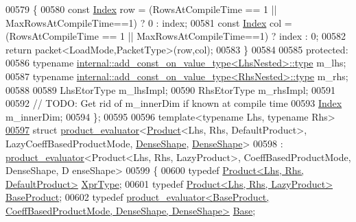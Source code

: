 \begin{DoxyCode}
00579 \textcolor{keyword}{  }\{
00580     \textcolor{keyword}{const} \hyperlink{namespace_eigen_a62e77e0933482dafde8fe197d9a2cfde}{Index} row = (RowsAtCompileTime == 1 || MaxRowsAtCompileTime==1) ? 0 : index;
00581     \textcolor{keyword}{const} \hyperlink{namespace_eigen_a62e77e0933482dafde8fe197d9a2cfde}{Index} col = (RowsAtCompileTime == 1 || MaxRowsAtCompileTime==1) ? index : 0;
00582     \textcolor{keywordflow}{return} packet<LoadMode,PacketType>(row,col);
00583   \}
00584 
00585 \textcolor{keyword}{protected}:
00586   \textcolor{keyword}{typename} \hyperlink{group___sparse_core___module}{internal::add\_const\_on\_value\_type<LhsNested>::type}
       m\_lhs;
00587   \textcolor{keyword}{typename} \hyperlink{group___sparse_core___module}{internal::add\_const\_on\_value\_type<RhsNested>::type}
       m\_rhs;
00588   
00589   LhsEtorType m\_lhsImpl;
00590   RhsEtorType m\_rhsImpl;
00591 
00592   \textcolor{comment}{// TODO: Get rid of m\_innerDim if known at compile time}
00593   \hyperlink{namespace_eigen_a62e77e0933482dafde8fe197d9a2cfde}{Index} m\_innerDim;
00594 \};
00595 
00596 \textcolor{keyword}{template}<\textcolor{keyword}{typename} Lhs, \textcolor{keyword}{typename} Rhs>
\hyperlink{struct_eigen_1_1internal_1_1product__evaluator_3_01_product_3_01_lhs_00_01_rhs_00_01_default_pro06ca9210bc576c533682d6dfc3cec111}{00597} \textcolor{keyword}{struct }\hyperlink{struct_eigen_1_1internal_1_1product__evaluator}{product\_evaluator}<\hyperlink{group___core___module_class_eigen_1_1_product}{Product}<Lhs, Rhs, DefaultProduct>, 
      LazyCoeffBasedProductMode, \hyperlink{struct_eigen_1_1_dense_shape}{DenseShape}, \hyperlink{struct_eigen_1_1_dense_shape}{DenseShape}>
00598   : \hyperlink{struct_eigen_1_1internal_1_1product__evaluator}{product\_evaluator}<Product<Lhs, Rhs, LazyProduct>, CoeffBasedProductMode, DenseShape, D
      enseShape>
00599 \{
00600   \textcolor{keyword}{typedef} \hyperlink{group___core___module_class_eigen_1_1_product}{Product<Lhs, Rhs, DefaultProduct>} 
      \hyperlink{group___core___module_class_eigen_1_1_product}{XprType};
00601   \textcolor{keyword}{typedef} \hyperlink{group___core___module_class_eigen_1_1_product}{Product<Lhs, Rhs, LazyProduct>} 
      \hyperlink{group___core___module_class_eigen_1_1_product}{BaseProduct};
00602   \textcolor{keyword}{typedef} 
      \hyperlink{struct_eigen_1_1internal_1_1product__evaluator}{product\_evaluator<BaseProduct, CoeffBasedProductMode, DenseShape, DenseShape>}
       \hyperlink{struct_eigen_1_1internal_1_1product__evaluator}{Base};

\end{DoxyCode}
